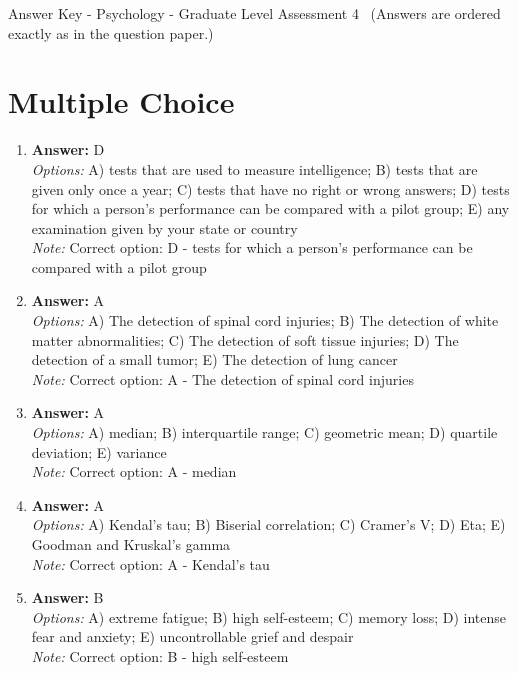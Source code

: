 \documentclass[12pt]{article}
\begin{document}
\begin{center}
Answer Key - Psychology - Graduate Level Assessment 4 \
\small (Answers are ordered exactly as in the question paper.)
\end{center}

\section*{Multiple Choice}
\begin{enumerate}[label=\arabic*.]
\item \textbf{Answer:} D
\\ \textit{Options:} A) tests that are used to measure intelligence; B) tests that are given only once a year; C) tests that have no right or wrong answers; D) tests for which a person's performance can be compared with a pilot group; E) any examination given by your state or country
\\ \textit{Note:} Correct option: D - tests for which a person's performance can be compared with a pilot group
\item \textbf{Answer:} A
\\ \textit{Options:} A) The detection of spinal cord injuries; B) The detection of white matter abnormalities; C) The detection of soft tissue injuries; D) The detection of a small tumor; E) The detection of lung cancer
\\ \textit{Note:} Correct option: A - The detection of spinal cord injuries
\item \textbf{Answer:} A
\\ \textit{Options:} A) median; B) interquartile range; C) geometric mean; D) quartile deviation; E) variance
\\ \textit{Note:} Correct option: A - median
\item \textbf{Answer:} A
\\ \textit{Options:} A) Kendal's tau; B) Biserial correlation; C) Cramer's V; D) Eta; E) Goodman and Kruskal's gamma
\\ \textit{Note:} Correct option: A - Kendal's tau
\item \textbf{Answer:} B
\\ \textit{Options:} A) extreme fatigue; B) high self-esteem; C) memory loss; D) intense fear and anxiety; E) uncontrollable grief and despair
\\ \textit{Note:} Correct option: B - high self-esteem
\end{enumerate}
\end{document}
